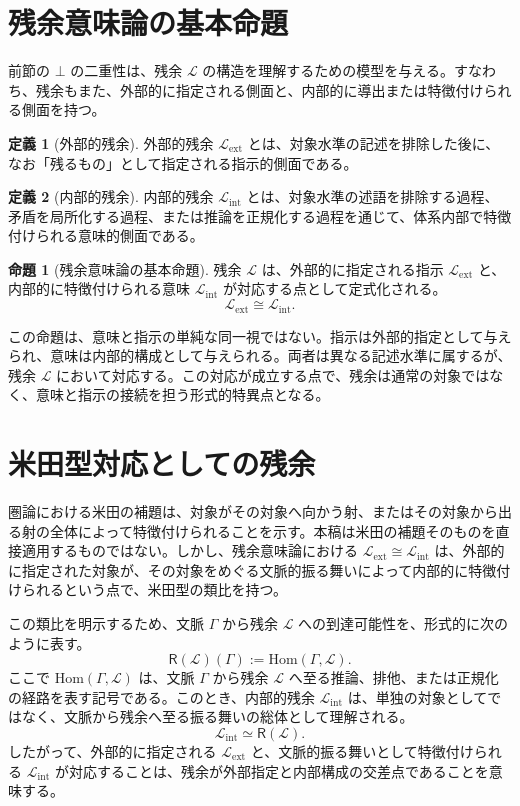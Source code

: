\documentclass[11pt,a4paper]{article}
\newcommand{\lhagma}{\mathcal{L}}
\newcommand{\ctx}{\Gamma}
\newcommand{\lext}{\lhagma_{\mathrm{ext}}}
\newcommand{\lint}{\lhagma_{\mathrm{int}}}
\newcommand{\yon}{\mathsf{R}}
\theoremstyle{definition}
\newtheorem{definition}{定義}[section]
\newtheorem{thesis}{命題}[section]
\begin{document}
\section{残余意味論の基本命題}

前節の $\bot$ の二重性は、残余 $\lhagma$ の構造を理解するための模型を与える。すなわち、残余もまた、外部的に指定される側面と、内部的に導出または特徴付けられる側面を持つ。

\begin{definition}[外部的残余]
外部的残余 $\lext$ とは、対象水準の記述を排除した後に、なお「残るもの」として指定される指示的側面である。
\end{definition}

\begin{definition}[内部的残余]
内部的残余 $\lint$ とは、対象水準の述語を排除する過程、矛盾を局所化する過程、または推論を正規化する過程を通じて、体系内部で特徴付けられる意味的側面である。
\end{definition}

\begin{thesis}[残余意味論の基本命題]
残余 $\lhagma$ は、外部的に指定される指示 $\lext$ と、内部的に特徴付けられる意味 $\lint$ が対応する点として定式化される。
\[
\lext \cong \lint .
\]
\end{thesis}

この命題は、意味と指示の単純な同一視ではない。指示は外部的指定として与えられ、意味は内部的構成として与えられる。両者は異なる記述水準に属するが、残余 $\lhagma$ において対応する。この対応が成立する点で、残余は通常の対象ではなく、意味と指示の接続を担う形式的特異点となる。

\section{米田型対応としての残余}

圏論における米田の補題は、対象がその対象へ向かう射、またはその対象から出る射の全体によって特徴付けられることを示す。本稿は米田の補題そのものを直接適用するものではない。しかし、残余意味論における $\lext \cong \lint$ は、外部的に指定された対象が、その対象をめぐる文脈的振る舞いによって内部的に特徴付けられるという点で、米田型の類比を持つ。

この類比を明示するため、文脈 $\ctx$ から残余 $\lhagma$ への到達可能性を、形式的に次のように表す。
\[
\yon(\lhagma)(\ctx) := \mathrm{Hom}(\ctx, \lhagma).
\]
ここで $\mathrm{Hom}(\ctx, \lhagma)$ は、文脈 $\ctx$ から残余 $\lhagma$ へ至る推論、排他、または正規化の経路を表す記号である。このとき、内部的残余 $\lint$ は、単独の対象としてではなく、文脈から残余へ至る振る舞いの総体として理解される。
\[
\lint \simeq \yon(\lhagma).
\]
したがって、外部的に指定される $\lext$ と、文脈的振る舞いとして特徴付けられる $\lint$ が対応することは、残余が外部指定と内部構成の交差点であることを意味する。
\end{document}
